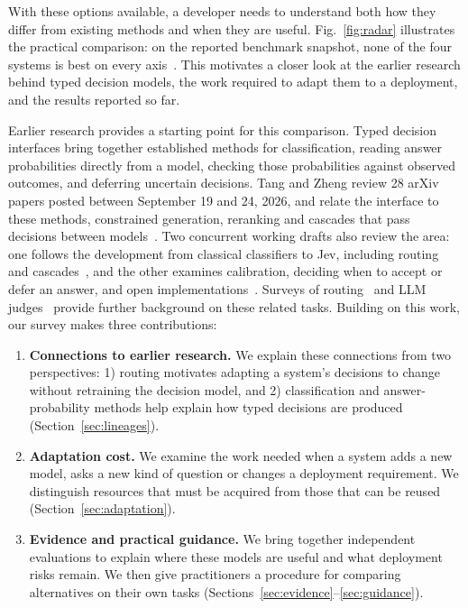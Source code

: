 With these options available, a developer needs to understand both how they differ from existing methods and when they are useful. Fig.~\ref{fig:radar} illustrates the practical comparison: on the reported benchmark snapshot, none of the four systems is best on every axis~\cite{jevbench2026v1422}. This motivates a closer look at the earlier research behind typed decision models, the work required to adapt them to a deployment, and the results reported so far.

Earlier research provides a starting point for this comparison. Typed decision interfaces bring together established methods for classification, reading answer probabilities directly from a model, checking those probabilities against observed outcomes, and deferring uncertain decisions. Tang and Zheng review 28 arXiv papers posted between September 19 and 24, 2026, and relate the interface to these methods, constrained generation, reranking and cascades that pass decisions between models~\cite{tang2026typed}. Two concurrent working drafts also review the area: one follows the development from classical classifiers to Jev, including routing and cascades~\cite{awesomejev2026decisions}, and the other examines calibration, deciding when to accept or defer an answer, and open implementations~\cite{luo2026jev}. Surveys of routing~\cite{varangotreille2025doing,moslem2026dynamic} and LLM judges~\cite{gu2024survey} provide further background on these related tasks. Building on this work, our survey makes three contributions:
\begin{enumerate}
\item \textbf{Connections to earlier research.} We explain these connections from two perspectives: 1) routing motivates adapting a system's decisions to change without retraining the decision model, and 2) classification and answer-probability methods help explain how typed decisions are produced (Section~\ref{sec:lineages}).
\item \textbf{Adaptation cost.} We examine the work needed when a system adds a new model, asks a new kind of question or changes a deployment requirement. We distinguish resources that must be acquired from those that can be reused (Section~\ref{sec:adaptation}).
\item \textbf{Evidence and practical guidance.} We bring together independent evaluations to explain where these models are useful and what deployment risks remain. We then give practitioners a procedure for comparing alternatives on their own tasks (Sections~\ref{sec:evidence}--\ref{sec:guidance}).
\end{enumerate}

